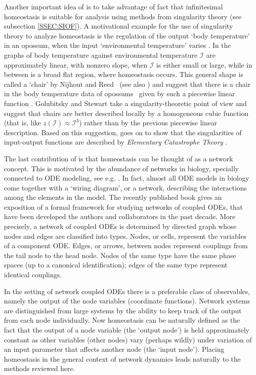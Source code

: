 \documentclass[a4paper,fleqn]{cas-dc}
\newcommand{\II}{{\mathcal I}}
\begin{document}
Another important idea of \cite{gs2017} is to take advantage of fact that infinitesimal homeostasis is suitable for analysis using methods from singularity theory (see subsection \ref{SSEC:SIOF}).
A motivational example for the use of singularity theory to analyze homeostasis is the regulation of the output `body temperature' in an opossum, when the input `environmental temperature' varies \cite{morrison1946}.
In \cite[Figs. 1--2]{gsahy2020} the graphs of body temperature against environmental temperature $\II$ are approximately linear, with nonzero slope, when $\II$ is either small or large, while in between is a broad flat region, where homeostasis occurs.
This general shape is called a `chair' by Nijhout and Reed~\cite{nr2014} (see also \cite{nbr2014, nrbu2004}) and suggest that there is a chair in the body temperature data of opossums~\cite{morrison1946} given by such a piecewise linear function \cite[Fig. 1]{nbr2014}.
Golubitsky and Stewart \cite{gs2017} take a singularity-theoretic point of view and suggest that chairs are better described locally by a homogeneous cubic function (that is, like $z(\II)\approx \II^3$) rather than by the previous
piecewise linear description.
Based on this suggestion, \cite{gs2017} goes on to show that the singularities of input-output functions are described by \emph{Elementary Catastrophe Theory} \cite{thom1969,thom1975,zeeman1977}.

The last contribution of \cite{gs2017} is that homeostasis can be thought of as a network concept.
This is motivated by the abundance of networks in biology, specially connected to ODE modeling, see e.g. \cite{nbr2014,rbgsn2017,ferrell2016}.
In fact, almost all ODE models in biology come together with a `wiring diagram', or a network, describing the interactions
among the elements in the model.
The recently published book \cite{gs2023} gives an exposition of a formal framework for studying networks of coupled ODEs, that have been developed the authors and collaborators in the past decade. 
More precisely, a network of coupled ODEs is determined by directed graph whose nodes and edges are classified into types. 
Nodes, or cells, represent the variables of a component ODE. 
Edges, or arrows, between nodes represent couplings
from the tail node to the head node. 
Nodes of the same type have the same phase spaces (up to a canonical identification); edges of the same type represent identical couplings.

In the setting of network coupled ODEs there is a preferable class of observables, namely the output of the node variables (coordinate functions).
Network systems are distinguished from large systems by the ability to keep track of the output from each node individually. 
Now homeostasis can be naturally defined as the fact that the output of a node variable (the `output node') is held approximately constant as other variables (other nodes) vary (perhaps wildly) under variation of an input parameter that affects another node (the `input node').
Placing homeostasis in the general context of network dynamics leads naturally to the methods reviewed here.
\end{document}
